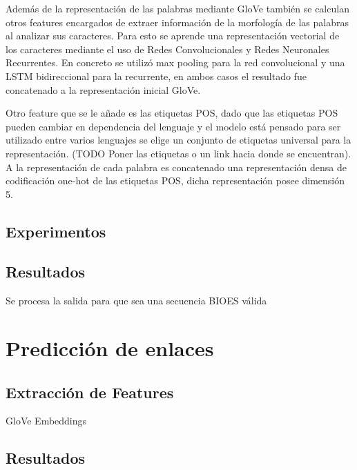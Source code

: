 Además de la representación de las palabras mediante GloVe también se calculan otros features
encargados de extraer información de la morfología de las palabras al analizar sus caracteres.
Para esto se aprende una representación vectorial de los caracteres mediante el uso de Redes Convolucionales
y Redes Neuronales Recurrentes. En concreto se utilizó max pooling para la red convolucional
y una LSTM bidireccional para la recurrente, en ambos casos el resultado fue concatenado
a la representación inicial GloVe.

Otro feature que se le añade es las etiquetas POS, dado que las etiquetas POS pueden
cambiar en dependencia del lenguaje y el modelo está pensado para ser utilizado entre
varios lenguajes se elige un conjunto de etiquetas universal para la representación.
(TODO Poner las etiquetas o un link hacia donde se encuentran). A la representación
de cada palabra es concatenado una representación densa de codificación one-hot de las 
etiquetas POS, dicha representación posee dimensión 5.

\subsection{Experimentos}



\subsection{Resultados}

Se procesa la salida para que sea una secuencia BIOES válida

\section{Predicción de enlaces}

\subsection{Extracción de Features}

GloVe Embeddings

\subsection{Resultados}
